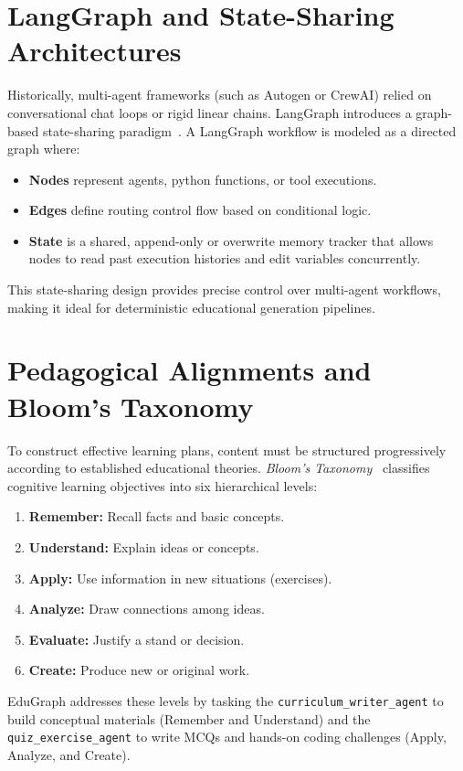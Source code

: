 \documentclass[12pt,a4paper]{report}
\begin{document}
\section{LangGraph and State-Sharing Architectures}
Historically, multi-agent frameworks (such as Autogen or CrewAI) relied on conversational chat loops or rigid linear chains. LangGraph introduces a graph-based state-sharing paradigm~\cite{langgraph2024}. A LangGraph workflow is modeled as a directed graph where:
\begin{itemize}
    \item \textbf{Nodes} represent agents, python functions, or tool executions.
    \item \textbf{Edges} define routing control flow based on conditional logic.
    \item \textbf{State} is a shared, append-only or overwrite memory tracker that allows nodes to read past execution histories and edit variables concurrently.
\end{itemize}
This state-sharing design provides precise control over multi-agent workflows, making it ideal for deterministic educational generation pipelines.

\section{Pedagogical Alignments and Bloom's Taxonomy}
To construct effective learning plans, content must be structured progressively according to established educational theories. \textit{Bloom's Taxonomy}~\cite{bloom1956taxonomy} classifies cognitive learning objectives into six hierarchical levels:
\begin{enumerate}
    \item \textbf{Remember:} Recall facts and basic concepts.
    \item \textbf{Understand:} Explain ideas or concepts.
    \item \textbf{Apply:} Use information in new situations (exercises).
    \item \textbf{Analyze:} Draw connections among ideas.
    \item \textbf{Evaluate:} Justify a stand or decision.
    \item \textbf{Create:} Produce new or original work.
\end{enumerate}
EduGraph addresses these levels by tasking the \texttt{curriculum\_writer\_agent} to build conceptual materials (Remember and Understand) and the \texttt{quiz\_exercise\_agent} to write MCQs and hands-on coding challenges (Apply, Analyze, and Create).
\end{document}
